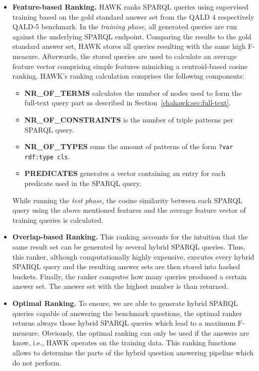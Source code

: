 \begin{itemize}
\item \textbf{Feature-based Ranking.} 
HAWK ranks SPARQL queries using supervised training based on the gold standard answer set from the \ac{QALD} 4 respectively \ac{QALD}-5  benchmark.
In the \emph{training phase}, all generated queries are run against the underlying SPARQL endpoint. 
Comparing the results to the gold standard answer set, HAWK stores all queries resulting with the same high F-measure.
Afterwards, the stored queries are used to calculate an average feature vector comprising simple features mimicking a centroid-based cosine ranking.
HAWK's ranking calculation comprises the following components:
\begin{itemize}
\item \textbf{NR\_OF\_TERMS} calculates the number of nodes used to form the full-text query part as described in Section~\ref{chahawk:sec:full-text}.
\item \textbf{NR\_OF\_CONSTRAINTS} is the number of triple patterns per SPARQL query.
\item \textbf{NR\_OF\_TYPES} sums the amount of patterns of the form \texttt{?var rdf:type cls}.
\item \textbf{PREDICATES} generates a vector containing an entry for each predicate used in the SPARQL query.
\end{itemize}
While running the \emph{test phase}, the cosine similarity between each SPARQL query using the above mentioned features and the average feature vector of training queries is calculated.

\item \textbf{Overlap-based Ranking.} This ranking accounts for the intuition that the same result set can be generated by several hybrid SPARQL queries. 
    Thus, this ranker, although computationally highly expensive, executes every hybrid SPARQL query and the resulting answer sets are then stored into hashed buckets. 
    Finally, the ranker computes how many queries produced a certain answer set. 
    The answer set with the highest number is than returned.
    
    \item \textbf{Optimal Ranking.} To ensure, we are able to generate hybrid SPARQL queries capable of answering the benchmark questions, the optimal ranker returns always those hybrid SPARQL queries which lead to a maximum F-measure.  
    Obviously, the optimal ranking can only be used if the answers are know, i.e., HAWK operates on the training data.
    This ranking functions allows to determine the parts of the hybrid question answering pipeline which do not perform. 

\end{itemize}


